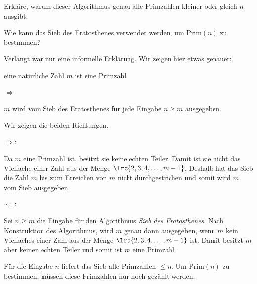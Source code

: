 \begin{myexercise}
	\begin{aenum}
		\item Erkläre, warum dieser Algorithmus genau alle Primzahlen kleiner oder gleich $n$ ausgibt.
		\item Wie kann das Sieb des Eratosthenes verwendet werden, um $\text{Prim}(n)$ zu bestimmen?
	\end{aenum}
	\begin{myanswer}
		\begin{aenum}
			\item Verlangt war nur eine informelle Erklärung. Wir zeigen hier etwas genauer:
			\begin{center}
				eine natürliche Zahl $m$ ist eine Primzahl

				$\Longleftrightarrow$

				$m$ wird vom Sieb des Eratosthenes für jede Eingabe $n\geq m$ ausgegeben.
			\end{center}
			Wir zeigen die beiden Richtungen.

			$\Rightarrow$:

			Da $m$ eine Primzahl ist, besitzt sie keine echten Teiler. Damit ist sie nicht das Vielfache einer Zahl aus der Menge $\lrc{2,3,4, \ldots , m-1}$.
			Deshalb hat das Sieb die Zahl $m$ bis zum Erreichen von $m$ nicht durchgestrichen und somit wird $m$ vom Sieb ausgegeben.

			$\Leftarrow$:

			Sei $n\geq m$ die Eingabe für den Algorithmus \textit{Sieb des Eratosthenes}. Nach Konstruktion des Algorithmus, wird $m$ genau dann ausgegeben, wenn $m$ kein Vielfaches einer Zahl aus der Menge $\lrc{2,3,4, \ldots , m-1}$ ist. Damit besitzt $m$ aber keinen echten Teiler und somit ist $m$ eine Primzahl.
			\item Für die Eingabe $n$ liefert das Sieb alle Primzahlen $\leq n$. Um $\text{Prim}(n)$ zu bestimmen, müssen diese Primzahlen nur noch gezählt werden.
		\end{aenum}
	\end{myanswer}
\end{myexercise}

